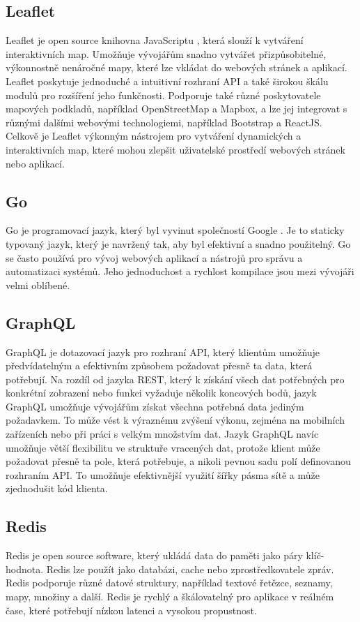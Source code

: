 \subsection{Leaflet}
Leaflet je open source knihovna JavaScriptu \cite{leaflet}, která slouží k vytváření interaktivních map. Umožňuje vývojářům snadno vytvářet přizpůsobitelné, výkonnostně nenáročné mapy, které lze vkládat do webových stránek a aplikací. Leaflet poskytuje jednoduché a intuitivní rozhraní API a také širokou škálu modulů pro rozšíření jeho funkčnosti. Podporuje také různé poskytovatele mapových podkladů, například OpenStreetMap a Mapbox, a lze jej integrovat s různými dalšími webovými technologiemi, například Bootstrap a ReactJS. Celkově je Leaflet výkonným nástrojem pro vytváření dynamických a interaktivních map, které mohou zlepšit uživatelské prostředí webových stránek nebo aplikací.
\subsection{Go}
Go je programovací jazyk, který byl vyvinut společností Google \cite{go}. Je to staticky typovaný jazyk, který je navržený tak, aby byl efektivní a snadno použitelný. Go se často používá pro vývoj webových aplikací a nástrojů pro správu a automatizaci systémů. Jeho jednoduchost a rychlost kompilace jsou mezi vývojáři velmi oblíbené.

\subsection{GraphQL}\label{graphql}
GraphQL \cite{graphql} je dotazovací jazyk pro rozhraní API, který klientům umožňuje předvídatelným a efektivním způsobem požadovat přesně ta data, která potřebují. Na rozdíl od jazyka REST, který k získání všech dat potřebných pro konkrétní zobrazení nebo funkci vyžaduje několik koncových bodů, jazyk GraphQL umožňuje vývojářům získat všechna potřebná data jediným požadavkem. To může vést k výraznému zvýšení výkonu, zejména na mobilních zařízeních nebo při práci s velkým množstvím dat. Jazyk GraphQL navíc umožňuje větší flexibilitu ve struktuře vracených dat, protože klient může požadovat přesně ta pole, která potřebuje, a nikoli pevnou sadu polí definovanou rozhraním API. To umožňuje efektivnější využití šířky pásma sítě a může zjednodušit kód klienta.
\subsection{Redis}\label{redis}
Redis je open source software, který ukládá data do paměti jako páry klíč-hodnota. Redis lze použít jako databázi, cache nebo zprostředkovatele zpráv. Redis podporuje různé datové struktury, například textové řetězce, seznamy, mapy, množiny a další. Redis je rychlý a škálovatelný pro aplikace v reálném čase, které potřebují nízkou latenci a vysokou propustnost. \cite{redis}

